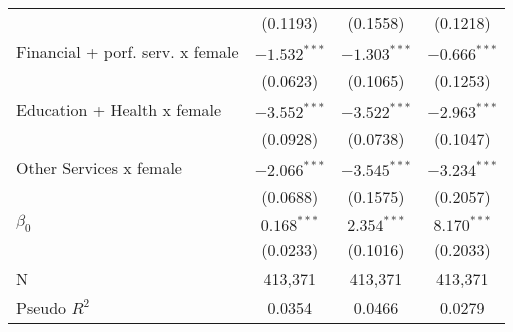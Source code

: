 \begin{tabular}{l|ccc|}
                                 &        (0.1193) &        (0.1558) &        (0.1218) \\
Financial + porf. serv. x female &  $-1.532^{***}$ &  $-1.303^{***}$ &  $-0.666^{***}$ \\
                                 &        (0.0623) &        (0.1065) &        (0.1253) \\
Education + Health x female      &  $-3.552^{***}$ &  $-3.522^{***}$ &  $-2.963^{***}$ \\
                                 &        (0.0928) &        (0.0738) &        (0.1047) \\
Other Services x female          &  $-2.066^{***}$ &  $-3.545^{***}$ &  $-3.234^{***}$ \\
                                 &        (0.0688) &        (0.1575) &        (0.2057) \\
$\beta_0$                        &   $0.168^{***}$ &   $2.354^{***}$ &   $8.170^{***}$ \\
                                 &        (0.0233) &        (0.1016) &        (0.2033) \\
N                                &         413,371 &         413,371 &         413,371 \\
Pseudo $R^2$                     &          0.0354 &          0.0466 &          0.0279 \\
\bottomrule
\end{tabular}
